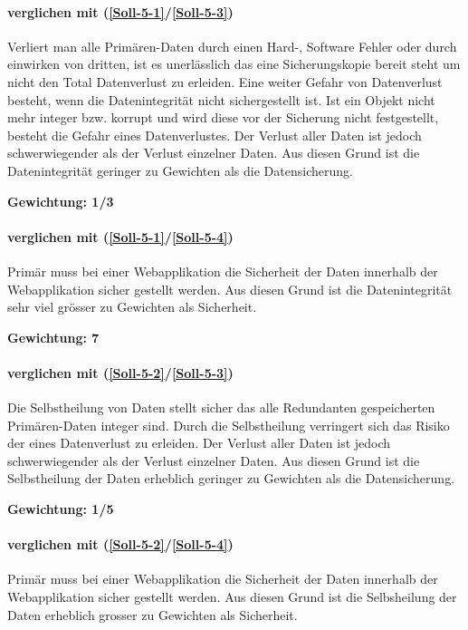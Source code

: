 \paragraph*{ verglichen mit  (\ref{Soll-5-1}/\ref{Soll-5-3})}
Verliert man alle \gls{Primären-Daten} durch einen Hard-, Software Fehler oder durch einwirken von dritten, ist es unerlässlich das eine Sicherungskopie bereit steht um nicht den Total Datenverlust zu erleiden.
Eine weiter Gefahr von Datenverlust besteht, wenn die Datenintegrität nicht sichergestellt ist. Ist ein Objekt nicht mehr integer bzw. korrupt und wird diese vor der Sicherung nicht festgestellt, besteht die Gefahr eines Datenverlustes.
Der Verlust aller Daten ist jedoch schwerwiegender als der Verlust einzelner Daten.
Aus diesen Grund ist die Datenintegrität geringer zu Gewichten als die Datensicherung.

\textbf{Gewichtung: 1/3}

\paragraph*{ verglichen mit  (\ref{Soll-5-1}/\ref{Soll-5-4})}
Primär muss bei einer Webapplikation die Sicherheit der Daten innerhalb der Webapplikation sicher gestellt werden. Aus diesen Grund ist die Datenintegrität sehr viel grösser zu Gewichten als Sicherheit.

\textbf{Gewichtung: 7}

\paragraph*{ verglichen mit  (\ref{Soll-5-2}/\ref{Soll-5-3})}
Die Selbstheilung von Daten stellt sicher das alle Redundanten gespeicherten \gls{Primären-Daten} integer sind. Durch die Selbstheilung verringert sich das Risiko der eines Datenverlust zu erleiden. 
Der Verlust aller Daten ist jedoch schwerwiegender als der Verlust einzelner Daten.
Aus diesen Grund ist die Selbstheilung der Daten erheblich geringer zu Gewichten als die Datensicherung.

\textbf{Gewichtung: 1/5}

\paragraph*{ verglichen mit  (\ref{Soll-5-2}/\ref{Soll-5-4})}
Primär muss bei einer Webapplikation die Sicherheit der Daten innerhalb der Webapplikation sicher gestellt werden. Aus diesen Grund ist die Selbsheilung der Daten erheblich grosser zu Gewichten als Sicherheit.

